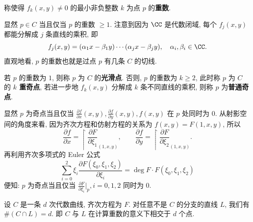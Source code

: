 \begin{defin}[重数]
\label{defin:multiplicity}
称使得 $f_k(x,y) \ne 0$ 的最小非负整数 $k$ 为点 $p$ 的\textbf{重数}.
\end{defin}

显然 $p \in C$ 当且仅当 $p$ 的重数 $\ge 1$.
注意到因为 $\CC$ 是代数闭域,
每个 $f_j(x,y)$ 都能分解成 $j$ 条直线的乘积, 即
\[f_j(x,y) = (\alpha_1x - \beta_1y)\cdots (\alpha_jx - \beta_jy), \quad \alpha_i,\beta_i \in \CC.\]
直观地看, $p$ 的重数也就是过点 $p$ 有几条 $C$ 的切线.

\begin{defin}[光滑点, 奇点]
\label{defin:smooth-point-and-singularity}
若 $p$ 的重数为 $1$, 则称 $p$ 为 $C$ 的\textbf{光滑点}.
否则, $p$ 的重数为 $k \ge 2$, 此时称 $p$ 为 $C$ 的 \textbf{$k$ 重奇点},
若进一步地 $f_k(x,y)$ 分解成 $k$ 条不同直线的乘积,
则称 $p$ 为\textbf{普通奇点}.
\end{defin}

显然 $p$ 为奇点当且仅当
$\frac{\partial f}{\partial x}(x,y), \frac{\partial f}{\partial y}(x,y), f(x,y)$
在 $p$ 处同时为 $0$.
从射影空间的角度来看,
因为齐次方程和仿射方程的关系为 $f(x,y) = F(1,x,y)$,
所以
\[
\frac{\partial f}{\partial x} = \restriction{\frac{\partial F}{\partial \xi_1}}_{(1,x,y)},
\qquad \frac{\partial f}{\partial y} = \restriction{\frac{\partial F}{\partial \xi_2}}_{(1,x,y)}.
\]
再利用齐次多项式的 Euler 公式
\[\sum_{i=0}^2\xi_i\frac{\partial F(\xi_0,\xi_1,\xi_2)}{\partial \xi_i} = \deg F\cdot F(\xi_0,\xi_1,\xi_2)\]
便知: $p$ 为奇点当且仅当 $\frac{\partial F}{\partial \xi_i}|_p, i = 0,1,2$ 同时为 $0$.

\begin{prop}
\label{prop:line-bezout}
设 $C$ 是一条 $d$ 次代数曲线, 齐次方程为 $F$.
对任意不是 $C$ 的分支的直线 $L$, 我们有 $\#(C\cap L) = d$.
即 $C$ 与 $L$ 在计算重数的意义下相交于 $d$ 个点.
\end{prop}

